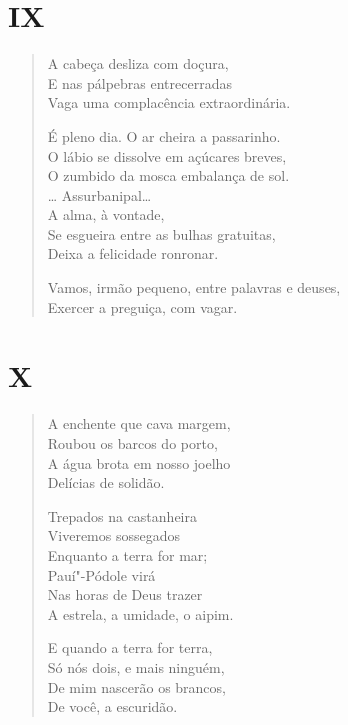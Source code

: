 {\medskip
\section*{IX}

\begin{verse}
A cabeça desliza com doçura,\\
E nas pálpebras entrecerradas\\
Vaga uma complacência extraordinária.

É pleno dia. O ar cheira a passarinho.\\
O lábio se dissolve em açúcares breves,\\
O zumbido da mosca embalança de sol.\\
\ldots{} Assurbanipal\ldots{}\\
A alma, à vontade,\\
Se esgueira entre as bulhas gratuitas,\\
Deixa a felicidade ronronar.

Vamos, irmão pequeno, entre palavras e deuses,\\
Exercer a preguiça, com vagar.
\end{verse}

\medskip
\section*{X}

\begin{verse}
A enchente que cava margem,\\
Roubou os barcos do porto,\\
A água brota em nosso joelho\\
Delícias de solidão.

Trepados na castanheira\\
Viveremos sossegados\\
Enquanto a terra for mar;\\
Pauí"-Pódole virá\\
Nas horas de Deus trazer\\
A estrela, a umidade, o aipim.

E quando a terra for terra,\\
Só nós dois, e mais ninguém,\\
De mim nascerão os brancos,\\
De você, a escuridão.
\end{verse}


}
